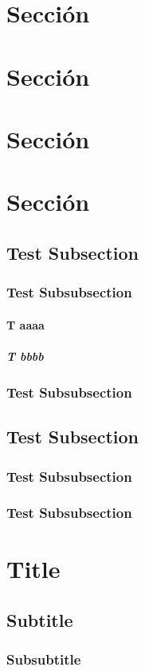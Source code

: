 \section{Sección}
\section{Sección}
\section{Sección}
\section{Sección}
\subsection{Test Subsection}
\subsubsection{Test Subsubsection}
\paragraph{T aaaa}
\subparagraph{T bbbb}
\subsubsection{Test Subsubsection}
\subsection{Test Subsection}
\subsubsection{Test Subsubsection}
\subsubsection{Test Subsubsection}

\clearpage

\section{Title}

\lipsum[5]

\subsection{Subtitle}

\lipsum[5]

\subsubsection{Subsubtitle}

\lipsum[5]


\lipsum[5]